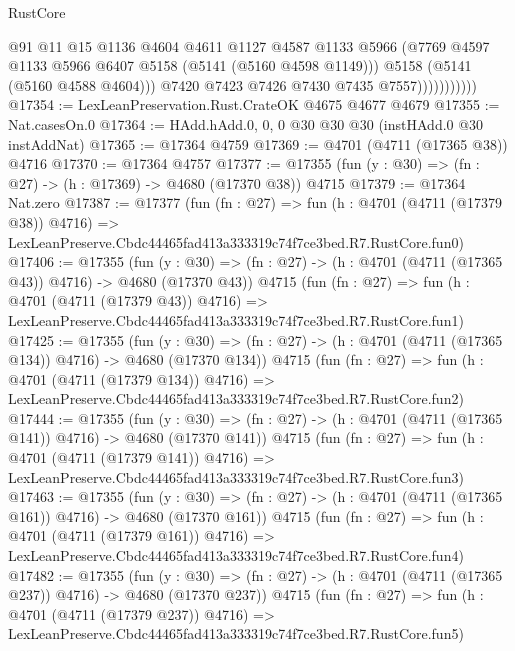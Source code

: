 \begin{lexlean}{RustCore}
\begin{coremodule}
                            @91
                            @11
                            @15
                            @1136
                            @4604
                            @4611
                            @1127
                            @4587
                            @1133
                            @5966
                            (@7769 @4597 @1133 @5966 @6407 @5158 (@5141 (@5160 @4598 @1149)))
                            @5158
                            (@5141 (@5160 @4588 @4604)))
                          @7420
                          @7423
                          @7426
                          @7430
                          @7435
                          @7557)))))))))))
@17354 := LexLeanPreservation.Rust.CrateOK @4675 @4677 @4679
@17355 := Nat.casesOn.{0}
@17364 := HAdd.hAdd.{0, 0, 0} @30 @30 @30 (instHAdd.{0} @30 instAddNat)
@17365 := @17364 @4759
@17369 := @4701 (@4711 (@17365 @38)) @4716
@17370 := @17364 @4757
@17377 := @17355 (fun (y : @30) => (fn : @27) -> (h : @17369) -> @4680 (@17370 @38)) @4715
@17379 := @17364 Nat.zero
@17387 := @17377
    (fun (fn : @27) =>
    fun (h : @4701 (@4711 (@17379 @38)) @4716) =>
    LexLeanPreserve.Cbdc44465fad413a333319c74f7ce3bed.R7.RustCore.fun0)
@17406 := @17355
    (fun (y : @30) => (fn : @27) -> (h : @4701 (@4711 (@17365 @43)) @4716) -> @4680 (@17370 @43))
    @4715
    (fun (fn : @27) =>
    fun (h : @4701 (@4711 (@17379 @43)) @4716) =>
    LexLeanPreserve.Cbdc44465fad413a333319c74f7ce3bed.R7.RustCore.fun1)
@17425 := @17355
    (fun (y : @30) => (fn : @27) -> (h : @4701 (@4711 (@17365 @134)) @4716) -> @4680 (@17370 @134))
    @4715
    (fun (fn : @27) =>
    fun (h : @4701 (@4711 (@17379 @134)) @4716) =>
    LexLeanPreserve.Cbdc44465fad413a333319c74f7ce3bed.R7.RustCore.fun2)
@17444 := @17355
    (fun (y : @30) => (fn : @27) -> (h : @4701 (@4711 (@17365 @141)) @4716) -> @4680 (@17370 @141))
    @4715
    (fun (fn : @27) =>
    fun (h : @4701 (@4711 (@17379 @141)) @4716) =>
    LexLeanPreserve.Cbdc44465fad413a333319c74f7ce3bed.R7.RustCore.fun3)
@17463 := @17355
    (fun (y : @30) => (fn : @27) -> (h : @4701 (@4711 (@17365 @161)) @4716) -> @4680 (@17370 @161))
    @4715
    (fun (fn : @27) =>
    fun (h : @4701 (@4711 (@17379 @161)) @4716) =>
    LexLeanPreserve.Cbdc44465fad413a333319c74f7ce3bed.R7.RustCore.fun4)
@17482 := @17355
    (fun (y : @30) => (fn : @27) -> (h : @4701 (@4711 (@17365 @237)) @4716) -> @4680 (@17370 @237))
    @4715
    (fun (fn : @27) =>
    fun (h : @4701 (@4711 (@17379 @237)) @4716) =>
    LexLeanPreserve.Cbdc44465fad413a333319c74f7ce3bed.R7.RustCore.fun5)

\end{coremodule}
\end{lexlean}
